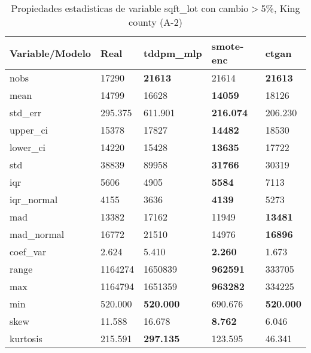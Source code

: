 \begin{table}[H]
\centering
\fontsize{8}{14}\selectfont
\caption{Propiedades estadisticas de variable sqft\_lot con cambio\ensuremath{>}5\%, King county (A-2)}
\label{table-stats-king county-a-2-sqft_lot-short}
\begin{tabular}{|l|m{10em}|m{10em}|m{10em}|m{10em}|}
\hline
 \rowcolor[gray]{0.8}
Variable/Modelo & Real & tddpm\_mlp & smote-enc & ctgan \\
\hline nobs & 17290 & \bfseries 21613 & \cellcolor[rgb]{0.9, 0.54, 0.52} 21614 & \bfseries 21613 \\
\hline mean & 14799 & 16628 & \bfseries 14059 & \cellcolor[rgb]{0.9, 0.54, 0.52} 18126 \\
\hline std\_err & 295.375 & \cellcolor[rgb]{0.9, 0.54, 0.52} 611.901 & \bfseries 216.074 & 206.230 \\
\hline upper\_ci & 15378 & 17827 & \bfseries 14482 & \cellcolor[rgb]{0.9, 0.54, 0.52} 18530 \\
\hline lower\_ci & 14220 & 15428 & \bfseries 13635 & \cellcolor[rgb]{0.9, 0.54, 0.52} 17722 \\
\hline std & 38839 & \cellcolor[rgb]{0.9, 0.54, 0.52} 89958 & \bfseries 31766 & 30319 \\
\hline iqr & 5606 & 4905 & \bfseries 5584 & \cellcolor[rgb]{0.9, 0.54, 0.52} 7113 \\
\hline iqr\_normal & 4155 & 3636 & \bfseries 4139 & \cellcolor[rgb]{0.9, 0.54, 0.52} 5273 \\
\hline mad & 13382 & \cellcolor[rgb]{0.9, 0.54, 0.52} 17162 & 11949 & \bfseries 13481 \\
\hline mad\_normal & 16772 & \cellcolor[rgb]{0.9, 0.54, 0.52} 21510 & 14976 & \bfseries 16896 \\
\hline coef\_var & 2.624 & \cellcolor[rgb]{0.9, 0.54, 0.52} 5.410 & \bfseries 2.260 & 1.673 \\
\hline range & 1164274 & 1650839 & \bfseries 962591 & \cellcolor[rgb]{0.9, 0.54, 0.52} 333705 \\
\hline max & 1164794 & 1651359 & \bfseries 963282 & \cellcolor[rgb]{0.9, 0.54, 0.52} 334225 \\
\hline min & 520.000 & \bfseries 520.000 & \cellcolor[rgb]{0.9, 0.54, 0.52} 690.676 & \bfseries 520.000 \\
\hline skew & 11.588 & 16.678 & \bfseries 8.762 & \cellcolor[rgb]{0.9, 0.54, 0.52} 6.046 \\
\hline kurtosis & 215.591 & \bfseries 297.135 & 123.595 & \cellcolor[rgb]{0.9, 0.54, 0.52} 46.341 \\

\end{tabular}
\end{table}
